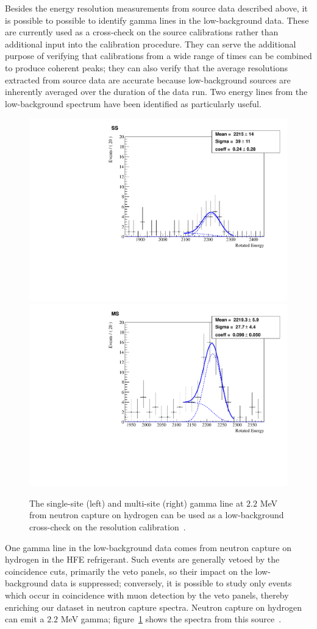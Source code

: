 Besides the energy resolution measurements from source data described above, it is possible to possible to identify gamma lines in the low-background data.  These are currently used as a cross-check on the source calibrations rather than additional input into the calibration procedure.  They can serve the additional purpose of verifying that calibrations from a wide range of times can be combined to produce coherent peaks; they can also verify that the average resolutions extracted from source data are accurate because low-background sources are inherently averaged over the duration of the data run.  Two energy lines from the low-background spectrum have been identified as particularly useful.

\begin{figure}
\begin{center}
\includegraphics[keepaspectratio=true,width=.49\textwidth]{neutronHydrogen_ss_denoised.pdf}
\includegraphics[keepaspectratio=true,width=.49\textwidth]{neutronHydrogen_ms_denoised.pdf}
\end{center}
\renewcommand{\baselinestretch}{1}
\small\normalsize
\begin{quote}
\caption{The single-site (left) and multi-site (right) gamma line at $2.2$ MeV from neutron capture on hydrogen can be used as a low-background cross-check on the resolution calibration~\cite{EnergyDocumentRun2ab}.}
\label{fig:neutronHydrogenCheck}
\end{quote}
\end{figure}
\renewcommand{\baselinestretch}{2}
\small\normalsize

One gamma line in the low-background data comes from neutron capture on hydrogen in the HFE refrigerant.  Such events are generally vetoed by the coincidence cuts, primarily the veto panels, so their impact on the low-background data is suppressed; conversely, it is possible to study only events which occur in coincidence with muon detection by the veto panels, thereby enriching our dataset in neutron capture spectra.  Neutron capture on hydrogen can emit a $2.2$ MeV gamma; figure~\ref{fig:neutronHydrogenCheck} shows the spectra from this source~\cite{NeutronCaptureGammas,EnergyDocumentRun2ab}.


